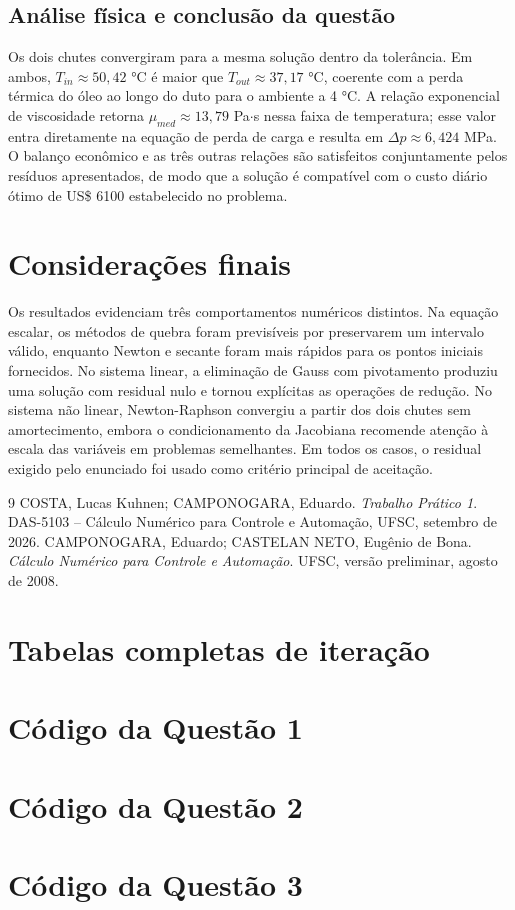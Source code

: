 \documentclass[11pt,a4paper]{article}
\begin{document}
\subsection{Análise física e conclusão da questão}

Os dois chutes convergiram para a mesma solução dentro da tolerância. Em ambos, $T_{in}\approx50,42$ °C é maior que $T_{out}\approx37,17$ °C, coerente com a perda térmica do óleo ao longo do duto para o ambiente a 4 °C. A relação exponencial de viscosidade retorna $\mu_{med}\approx13,79$ Pa$\cdot$s nessa faixa de temperatura; esse valor entra diretamente na equação de perda de carga e resulta em $\Delta p\approx6,424$ MPa. O balanço econômico e as três outras relações são satisfeitos conjuntamente pelos resíduos apresentados, de modo que a solução é compatível com o custo diário ótimo de US\$ 6100 estabelecido no problema.

\section{Considerações finais}

Os resultados evidenciam três comportamentos numéricos distintos. Na equação escalar, os métodos de quebra foram previsíveis por preservarem um intervalo válido, enquanto Newton e secante foram mais rápidos para os pontos iniciais fornecidos. No sistema linear, a eliminação de Gauss com pivotamento produziu uma solução com residual nulo e tornou explícitas as operações de redução. No sistema não linear, Newton-Raphson convergiu a partir dos dois chutes sem amortecimento, embora o condicionamento da Jacobiana recomende atenção à escala das variáveis em problemas semelhantes. Em todos os casos, o residual exigido pelo enunciado foi usado como critério principal de aceitação.

\begin{thebibliography}{9}
 COSTA, Lucas Kuhnen; CAMPONOGARA, Eduardo. \textit{Trabalho Prático 1}. DAS-5103 -- Cálculo Numérico para Controle e Automação, UFSC, setembro de 2026.
 CAMPONOGARA, Eduardo; CASTELAN NETO, Eugênio de Bona. \textit{Cálculo Numérico para Controle e Automação}. UFSC, versão preliminar, agosto de 2008.
\end{thebibliography}

\appendix
\section{Tabelas completas de iteração}

\section{Código da Questão 1}

\section{Código da Questão 2}

\section{Código da Questão 3}

\end{document}
